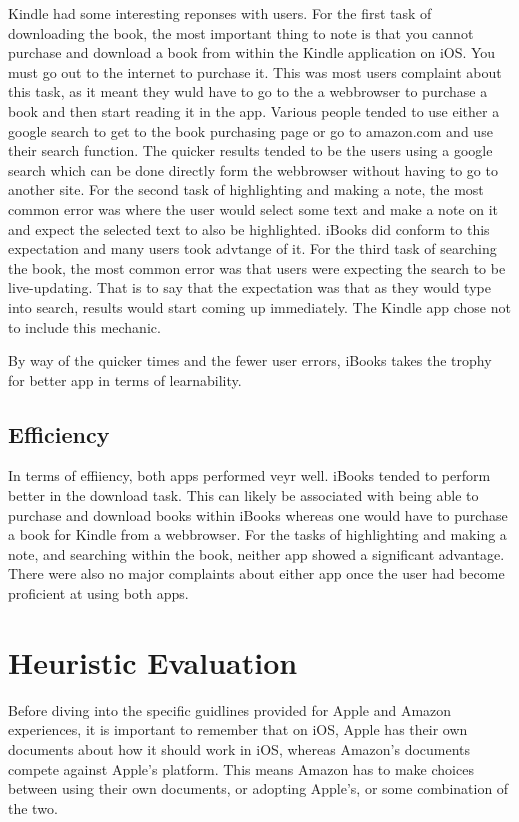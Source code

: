 \documentclass[journal,letterpaper]{article}
\begin{document}
    Kindle had some interesting reponses with users. For the first task of downloading the book, the most important thing to note is that you cannot purchase and download a book from within the Kindle application on iOS. You must go out to the internet to purchase it. This was most users complaint about this task, as it meant they wuld have to go to the a webbrowser to purchase a book and then start reading it in the app. Various people tended to use either a google search to get to the book purchasing page or go to amazon.com and use their search function. The quicker results tended to be the users using a google search which can be done directly form the webbrowser without having to go to another site. For the second task of highlighting and making a note, the most common error was where the user would select some text and make a note on it and expect the selected text to also be highlighted. iBooks did conform to this expectation and many users took advtange of it. For the third task of searching the book, the most common error was that users were expecting the search to be live-updating. That is to say that the expectation was that as they would type into search, results would start coming up immediately. The Kindle app chose not to include this mechanic.

    By way of the quicker times and the fewer user errors, iBooks takes the trophy for better app in terms of learnability.

    \subsection{Efficiency}
    In terms of effiiency, both apps performed veyr well. iBooks tended to perform better in the download task. This can likely be associated with being able to purchase and download books within iBooks whereas one would have to purchase a book for Kindle from a webbrowser. For the tasks of highlighting and making a note, and searching within the book, neither app showed a significant advantage. There were also no major complaints about either app once the user had become proficient at using both apps. 

    \section{Heuristic Evaluation}
    \label{Hueristic Evaluation}

    Before diving into the specific guidlines provided for Apple and Amazon experiences, it is important to remember that on iOS, Apple has their own documents about how it should work in iOS, whereas Amazon's documents compete against Apple's platform. This means Amazon has to make choices between using their own documents, or adopting Apple's, or some combination of the two.
\end{document}
